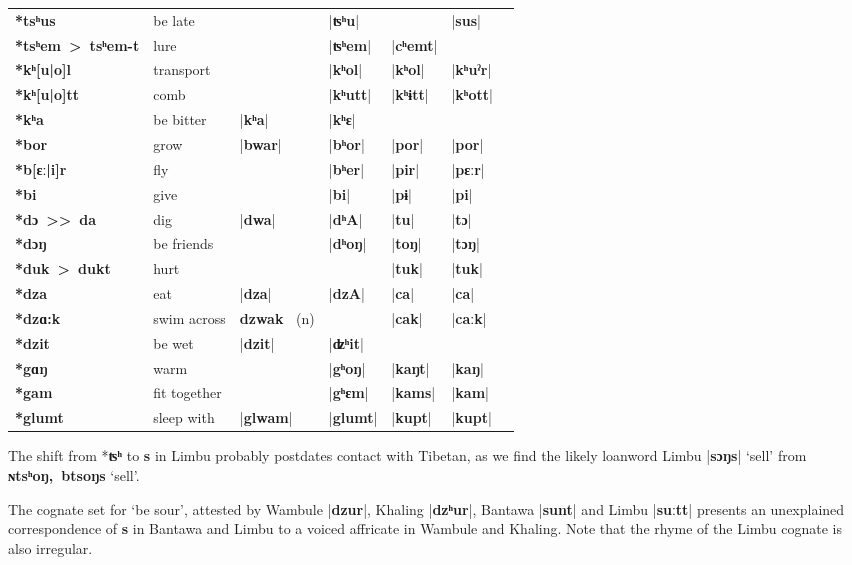 \documentclass[oneside,a4paper,11pt]{article}
\newcommand{\ipa}[1]{\textbf{{\phon\mbox{#1}}}} %
\newcommand{\dhatu}[2]{|\ipa{#1}| `#2'}
\newcommand{\dhat}[1]{|\ipa{#1}|}
\begin{document}
\begin{table}
\begin{tabular}{lllllll}
\ipa{*tsʰus} &	be late &	&	\dhat{ʦʰu} &	&	\dhat{sus} &	\\
\ipa{*tsʰem > tsʰem-t} &	lure &	&	\dhat{ʦʰem} &	\dhat{cʰemt} &	&	\\
\midrule
\ipa{*kʰ[u|o]l} &	transport &	&	\dhat{kʰol} &	\dhat{kʰol} &	\dhat{kʰuˀr} &	\\
\ipa{*kʰ[u|o]tt} &	comb &	&	\dhat{kʰutt} &	\dhat{kʰɨtt} &	\dhat{kʰott} &	\\
\ipa{*kʰa} &	be bitter &	\dhat{kʰa} &	\dhat{kʰɛ} &	&	&	\\
\midrule
\ipa{*bor} &	grow &	\dhat{bwar} &	\dhat{bʰor} &	\dhat{por} &	\dhat{por} &	\\
\ipa{*b[ɛː|i]r} &	fly &	&	\dhat{bʰer} &	\dhat{pir} &	\dhat{pɛːr} &	\\
\ipa{*bi} &	give &	&	\dhat{bi} &	\dhat{pɨ} &	\dhat{pi} &	\\
\midrule
\ipa{*dɔ >{}>  da} &	dig &	\dhat{dwa} &	\dhat{dʰA} &	\dhat{tu} &	\dhat{tɔ} &	\\
\ipa{*dɔŋ} &	be friends &	&	\dhat{dʰoŋ} &	\dhat{toŋ} &	\dhat{tɔŋ} &	\\
\ipa{*duk > dukt} &	hurt &	&	&	\dhat{tuk} &	\dhat{tuk} &	\\
\midrule				
\ipa{*dza} &	eat &	\dhat{dza} &	\dhat{dzA} &	\dhat{ca} &	\dhat{ca} &	\\
\ipa{*dzɑ:k} &	swim across &	\ipa{dzwak } (n) &	&	\dhat{cak} &	\dhat{caːk} &	\\
\ipa{*dzit} &	be wet &	\dhat{dzit}   &	\dhat{ʣʰit} &	&	&	\\
\midrule		
\ipa{*gɑŋ} &	warm &	&	\dhat{gʰoŋ} &	\dhat{kaŋt} &	\dhat{kaŋ} &	\\
\ipa{*gam} &	fit together &	&	\dhat{gʰɛm} &	\dhat{kams} &	\dhat{kam} &	\\
\ipa{*glumt} &	sleep with &	\dhat{glwam} &	\dhat{glumt} &	\dhat{kupt} &	\dhat{kupt} &	\\
\bottomrule
\end{tabular}
\end{table}

The shift from *\ipa{ʦʰ} to \ipa{s} in Limbu probably postdates contact with Tibetan, as we find the likely loanword Limbu \dhatu{sɔŋs}{sell} from \ipa{ɴtsʰoŋ, btsoŋs} `sell'.


The cognate set for `be sour', attested by Wambule |\ipa{dzur}|, Khaling |\ipa{dzʰur}|, Bantawa |\ipa{sunt}| and Limbu |\ipa{suːtt}| presents an unexplained correspondence of \ipa{s} in Bantawa and Limbu to a voiced affricate in Wambule and Khaling. Note that the rhyme of the Limbu cognate is also irregular.
\end{document}
